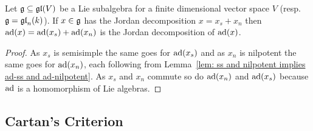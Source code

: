 \begin{cor}\label{cor: concrete Jordan decomposition compatible with adjoint representation}
 Let $\mathfrak{g} \subseteq \mathfrak{gl}(V)$ be a Lie subalgebra for a finite dimensional vector space $V$ (resp.\ $\mathfrak{g} = \mathfrak{gl}_n(k)$). If $x \in \mathfrak{g}$ has the Jordan decomposition $x = x_s + x_n$ then $\operatorname{ad}(x) = \operatorname{ad}(x_s) + \operatorname{ad}(x_n)$ is the Jordan decomposition of $\operatorname{ad}(x)$.
\end{cor}
\begin{proof}
 As $x_s$ is semisimple the same goes for $\operatorname{ad}(x_s)$ and as $x_n$ is nilpotent the same goes for $\operatorname{ad}(x_n)$, each following from Lemma~\ref{lem: ss and nilpotent implies ad-ss and ad-nilpotent}. As $x_s$ and $x_n$ commute so do $\operatorname{ad}(x_n)$ and $\operatorname{ad}(x_s)$ because $\operatorname{ad}$ is a homomorphism of Lie algebras.
\end{proof}





\subsection{Cartan’s Criterion}



